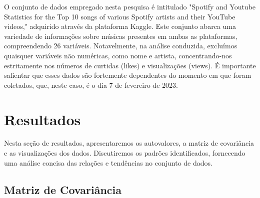 \documentclass{article}
\begin{document}
O conjunto de dados empregado nesta pesquisa é intitulado "Spotify and Youtube Statistics for the Top 10 songs of various Spotify artists and their YouTube videos," adquirido através da plataforma Kaggle. Este conjunto abarca uma variedade de informações sobre músicas presentes em ambas as plataformas, compreendendo 26 variáveis. Notavelmente, na análise conduzida, excluímos quaisquer variáveis não numéricas, como nome e artista, concentrando-nos estritamente nos números de curtidas (likes) e visualizações (views). É importante salientar que 
esses dados são fortemente dependentes do momento em que foram coletados, que, neste caso, é o dia 7 de fevereiro de 2023.

\section{Resultados}

Nesta seção de resultados, apresentaremos os autovalores, a matriz de covariância e as visualizações dos dados. Discutiremos os padrões identificados, fornecendo uma análise concisa das relações e tendências no conjunto de dados.


\subsection{Matriz de Covariância}
\end{document}
